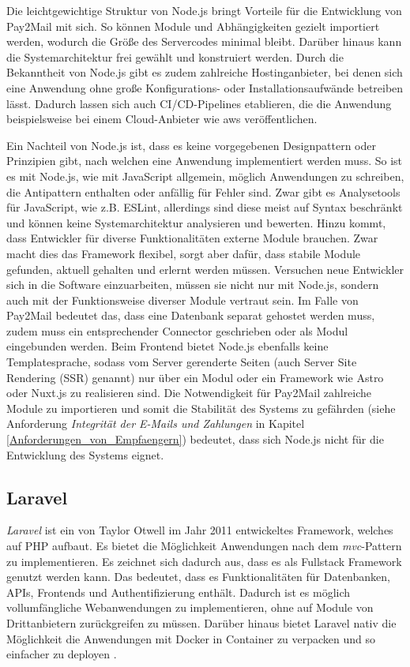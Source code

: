 Die leichtgewichtige Struktur von Node.js bringt Vorteile für die Entwicklung von Pay2Mail mit sich. So können Module und Abhängigkeiten gezielt importiert werden, wodurch die Größe des Servercodes minimal bleibt. Darüber hinaus kann die Systemarchitektur frei gewählt und konstruiert werden. Durch die Bekanntheit von Node.js gibt es zudem zahlreiche Hostinganbieter, bei denen sich eine Anwendung ohne große Konfigurations- oder Installationsaufwände betreiben lässt. Dadurch lassen sich auch CI/CD-Pipelines etablieren, die die Anwendung beispielsweise bei einem Cloud-Anbieter wie \acrfull{aws} veröffentlichen.

Ein Nachteil von Node.js ist, dass es keine vorgegebenen Designpattern oder Prinzipien gibt, nach welchen eine Anwendung implementiert werden muss. So ist es mit Node.js, wie mit JavaScript allgemein, möglich Anwendungen zu schreiben, die Antipattern enthalten oder anfällig für Fehler sind. Zwar gibt es Analysetools für JavaScript, wie z.B. ESLint, allerdings sind diese meist auf Syntax beschränkt und können keine Systemarchitektur analysieren und bewerten. Hinzu kommt, dass Entwickler für diverse Funktionalitäten externe Module brauchen. Zwar macht dies das Framework flexibel, sorgt aber dafür, dass stabile Module gefunden, aktuell gehalten und erlernt werden müssen. Versuchen neue Entwickler sich in die Software einzuarbeiten, müssen sie nicht nur mit Node.js, sondern auch mit der Funktionsweise diverser Module vertraut sein. Im Falle von Pay2Mail bedeutet das, dass eine Datenbank separat gehostet werden muss, zudem muss ein entsprechender Connector geschrieben oder als Modul eingebunden werden. Beim Frontend bietet Node.js ebenfalls keine Templatesprache, sodass vom Server gerenderte Seiten (auch Server Site Rendering (SSR) genannt) nur über ein Modul oder ein Framework wie Astro oder Nuxt.js zu realisieren sind. Die Notwendigkeit für Pay2Mail zahlreiche Module zu importieren und somit die Stabilität des Systems zu gefährden (siehe Anforderung \textit{Integrität der E-Mails und Zahlungen} in Kapitel \ref{Anforderungen_von_Empfaengern}) bedeutet, dass sich Node.js nicht für die Entwicklung des Systems eignet.

\subsection{Laravel}
\label{Laravel}

\textit{Laravel} ist ein von Taylor Otwell im Jahr 2011 entwickeltes Framework, welches auf PHP aufbaut. Es bietet die Möglichkeit Anwendungen nach dem \textit{\acrfull{mvc}}-Pattern zu implementieren. Es zeichnet sich dadurch aus, dass es als Fullstack Framework genutzt werden kann. Das bedeutet, dass es Funktionalitäten für Datenbanken, APIs, Frontends und Authentifizierung enthält. Dadurch ist es möglich vollumfängliche Webanwendungen zu implementieren, ohne auf Module von Drittanbietern zurückgreifen zu müssen. Darüber hinaus bietet Laravel nativ die Möglichkeit die Anwendungen mit Docker in Container zu verpacken und so einfacher zu deployen \citep{Otwell2022}.

